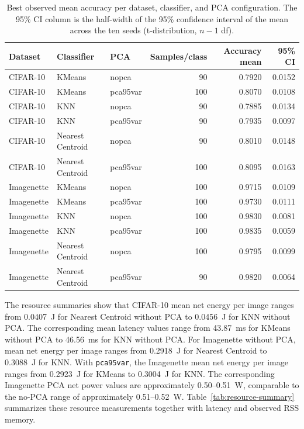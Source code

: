 \documentclass[sigconf,review]{acmart}
\begin{document}
\begin{table}[t]
  \caption{Best observed mean accuracy per dataset, classifier, and PCA configuration. The 95\% CI column is the half-width of the 95\% confidence interval of the mean across the ten seeds (t-distribution, $n-1$ df).}
  \label{tab:best-accuracy}
  \centering
  \footnotesize
  \begin{tabular}{@{}lllrrr@{}}
    \toprule
    Dataset & Classifier & PCA & Samples/class & Accuracy mean & 95\% CI \\
    \midrule
    CIFAR-10 & KMeans & nopca & 90 & 0.7920 & 0.0152 \\
    CIFAR-10 & KMeans & pca95var & 100 & 0.8070 & 0.0108 \\
    CIFAR-10 & KNN & nopca & 90 & 0.7885 & 0.0134 \\
    CIFAR-10 & KNN & pca95var & 90 & 0.7935 & 0.0097 \\
    CIFAR-10 & Nearest Centroid & nopca & 90 & 0.8010 & 0.0148 \\
    CIFAR-10 & Nearest Centroid & pca95var & 100 & 0.8095 & 0.0163 \\
    Imagenette & KMeans & nopca & 100 & 0.9715 & 0.0109 \\
    Imagenette & KMeans & pca95var & 100 & 0.9730 & 0.0111 \\
    Imagenette & KNN & nopca & 100 & 0.9830 & 0.0081 \\
    Imagenette & KNN & pca95var & 100 & 0.9835 & 0.0059 \\
    Imagenette & Nearest Centroid & nopca & 100 & 0.9795 & 0.0099 \\
    Imagenette & Nearest Centroid & pca95var & 90 & 0.9820 & 0.0064 \\
    \bottomrule
  \end{tabular}
\end{table}

The resource summaries show that CIFAR-10 mean net energy per image ranges from 0.0407~J for Nearest Centroid without PCA to 0.0456~J for KNN without PCA.
The corresponding mean latency values range from 43.87~ms for KMeans without PCA to 46.56~ms for KNN without PCA.
For Imagenette without PCA, mean net energy per image ranges from 0.2918~J for Nearest Centroid to 0.3088~J for KNN.
With \texttt{pca95var}, the Imagenette mean net energy per image ranges from 0.2923~J for KMeans to 0.3004~J for KNN.
The corresponding Imagenette PCA net power values are approximately 0.50--0.51~W, comparable to the no-PCA range of approximately 0.51--0.52~W.
Table~\ref{tab:resource-summary} summarizes these resource measurements together with latency and observed RSS memory.
\end{document}
